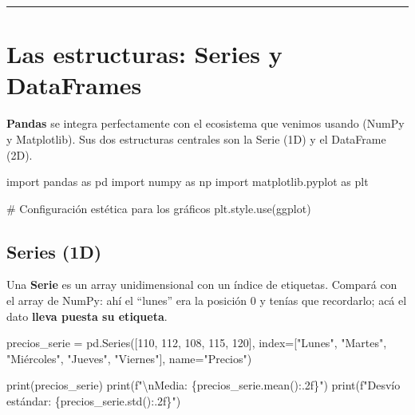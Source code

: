 \documentclass[
  spanish,
  letterpaper,
  DIV=11,
  numbers=noendperiod]{scrreprt}
\newenvironment{Shaded}{\begin{snugshade}}{\end{snugshade}}
\newcommand{\BuiltInTok}[1]{\textcolor[rgb]{0.00,0.23,0.31}{#1}}
\newcommand{\CharTok}[1]{\textcolor[rgb]{0.13,0.47,0.30}{#1}}
\newcommand{\CommentTok}[1]{\textcolor[rgb]{0.37,0.37,0.37}{#1}}
\newcommand{\DecValTok}[1]{\textcolor[rgb]{0.68,0.00,0.00}{#1}}
\newcommand{\ImportTok}[1]{\textcolor[rgb]{0.00,0.46,0.62}{#1}}
\newcommand{\NormalTok}[1]{\textcolor[rgb]{0.00,0.23,0.31}{#1}}
\newcommand{\OperatorTok}[1]{\textcolor[rgb]{0.37,0.37,0.37}{#1}}
\newcommand{\SpecialCharTok}[1]{\textcolor[rgb]{0.37,0.37,0.37}{#1}}
\newcommand{\SpecialStringTok}[1]{\textcolor[rgb]{0.13,0.47,0.30}{#1}}
\newcommand{\StringTok}[1]{\textcolor[rgb]{0.13,0.47,0.30}{#1}}
\begin{document}
\begin{center}\rule{0.5\linewidth}{0.5pt}\end{center}

\section{Las estructuras: Series y
DataFrames}\label{las-estructuras-series-y-dataframes}

\textbf{Pandas} se integra perfectamente con el ecosistema que venimos
usando (NumPy y Matplotlib). Sus dos estructuras centrales son la Serie
(1D) y el DataFrame (2D).

\label{setup}
\begin{Shaded}
\begin{Highlighting}[]
\ImportTok{import}\NormalTok{ pandas }\ImportTok{as}\NormalTok{ pd}
\ImportTok{import}\NormalTok{ numpy }\ImportTok{as}\NormalTok{ np}
\ImportTok{import}\NormalTok{ matplotlib.pyplot }\ImportTok{as}\NormalTok{ plt}

\CommentTok{\# Configuración estética para los gráficos}
\NormalTok{plt.style.use(}\StringTok{\textquotesingle{}ggplot\textquotesingle{}}\NormalTok{)}
\end{Highlighting}
\end{Shaded}

\subsection{Series (1D)}\label{series-1d}

Una \textbf{Serie} es un array unidimensional con un índice de
etiquetas. Compará con el array de NumPy: ahí el ``lunes'' era la
posición 0 y tenías que recordarlo; acá el dato \textbf{lleva puesta su
etiqueta}.

\label{pandas-series}
\begin{Shaded}
\begin{Highlighting}[]
\NormalTok{precios\_serie }\OperatorTok{=}\NormalTok{ pd.Series([}\DecValTok{110}\NormalTok{, }\DecValTok{112}\NormalTok{, }\DecValTok{108}\NormalTok{, }\DecValTok{115}\NormalTok{, }\DecValTok{120}\NormalTok{],}
\NormalTok{                          index}\OperatorTok{=}\NormalTok{[}\StringTok{"Lunes"}\NormalTok{, }\StringTok{"Martes"}\NormalTok{, }\StringTok{"Miércoles"}\NormalTok{, }\StringTok{"Jueves"}\NormalTok{, }\StringTok{"Viernes"}\NormalTok{],}
\NormalTok{                          name}\OperatorTok{=}\StringTok{"Precios"}\NormalTok{)}

\BuiltInTok{print}\NormalTok{(precios\_serie)}
\BuiltInTok{print}\NormalTok{(}\SpecialStringTok{f"}\CharTok{\textbackslash{}n}\SpecialStringTok{Media: }\SpecialCharTok{\{}\NormalTok{precios\_serie}\SpecialCharTok{.}\NormalTok{mean()}\SpecialCharTok{:.2f\}}\SpecialStringTok{"}\NormalTok{)}
\BuiltInTok{print}\NormalTok{(}\SpecialStringTok{f"Desvío estándar: }\SpecialCharTok{\{}\NormalTok{precios\_serie}\SpecialCharTok{.}\NormalTok{std()}\SpecialCharTok{:.2f\}}\SpecialStringTok{"}\NormalTok{)}
\end{Highlighting}
\end{Shaded}
\end{document}
